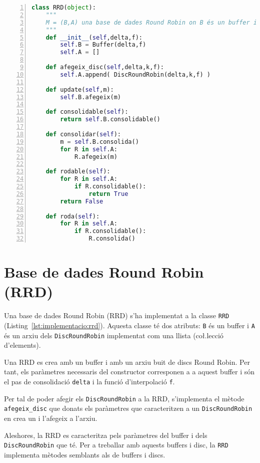 \begin{lstlisting}[float,language=Python,caption=Implementació de la classe RRD,label=lst:implementacio:rrd,numbers=left]
class RRD(object):
    """
    M = (B,A) una base de dades Round Robin on B és un buffer i A és un conjunt de discs Round Robin
    """
    def __init__(self,delta,f):
        self.B = Buffer(delta,f)
        self.A = []

    def afegeix_disc(self,delta,k,f):
        self.A.append( DiscRoundRobin(delta,k,f) )

    def update(self,m):
        self.B.afegeix(m)

    def consolidable(self):
        return self.B.consolidable()

    def consolidar(self):
        m = self.B.consolida()
        for R in self.A:
            R.afegeix(m)

    def rodable(self):
        for R in self.A:
            if R.consolidable():
                return True
        return False

    def roda(self):
        for R in self.A:
            if R.consolidable():
                R.consolida()

\end{lstlisting}

\section[RRD]{Base de dades Round Robin (RRD)}

Una base de dades Round Robin (RRD) s'ha implementat a la classe \verb+RRD+ (Listing~\ref{lst:implementacio:rrd}). Aquesta classe té dos atributs: \verb+B+ és un buffer i \verb+A+ és un arxiu dels \verb+DiscRoundRobin+ implementat com una llista (co\l.lecció d'elements).

Una RRD es crea amb un buffer i amb un arxiu buit de discs Round Robin. Per tant, els paràmetres necessaris del constructor corresponen a a aquest buffer i són el pas de consolidació \verb+delta+ i la funció d'interpolació \verb+f+.

Per tal de poder afegir els \verb+DiscRoundRobin+ a la RRD, s'implementa el mètode \verb+afegeix_disc+ que donats els paràmetres que caracteritzen a un \verb+DiscRoundRobin+ en crea un i l'afegeix a l'arxiu.

Aleshores, la RRD es caracteritza pels paràmetres del buffer i dels \verb+DiscRoundRobin+ que té. Per a treballar amb aquests buffers i disc, la \verb+RRD+ implementa mètodes semblants als de buffers i discs.

